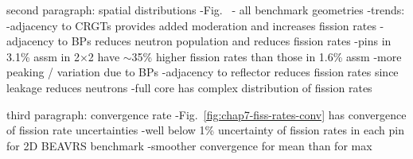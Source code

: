 second paragraph: spatial distributions
-Fig.~ - all benchmark geometries
-trends:
  -adjacency to \ac{CRGT}s provides added moderation and increases fission rates
  -adjacency to \ac{BP}s reduces neutron population and reduces fission rates
  -pins in 3.1\% assm in 2$\times$2 have $\sim$35\% higher fission rates than those in 1.6\% assm
    -more peaking / variation due to \ac{BP}s
  -adjacency to reflector reduces fission rates since leakage reduces neutrons
  -full core has complex distribution of fission rates

third paragraph: convergence rate
-Fig.~\ref{fig:chap7-fiss-rates-conv} has convergence of fission rate uncertainties
-well below 1\% uncertainty of fission rates in each pin for 2D \ac{BEAVRS} benchmark
-smoother convergence for mean than for max

